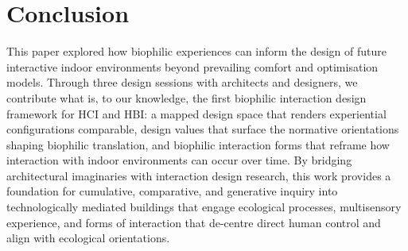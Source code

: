 \section{Conclusion}
\label{sec:ch5-conclusion}

This paper explored how biophilic experiences can inform the design of future interactive indoor environments beyond prevailing comfort and optimisation models. Through three design sessions with architects and designers, we contribute what is, to our knowledge, the first biophilic interaction design framework for HCI and HBI: a mapped design space that renders experiential configurations comparable, design values that surface the normative orientations shaping biophilic translation, and biophilic interaction forms that reframe how interaction with indoor environments can occur over time. By bridging architectural imaginaries with interaction design research, this work provides a foundation for cumulative, comparative, and generative inquiry into technologically mediated buildings that engage ecological processes, multisensory experience, and forms of interaction that de-centre direct human control and align with ecological orientations.